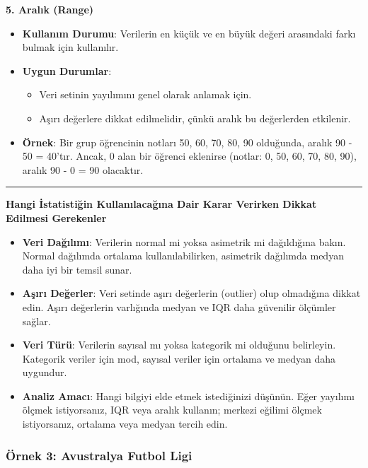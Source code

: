 \documentclass[
  letterpaper,
  DIV=11,
  numbers=noendperiod]{scrartcl}
\begin{document}
\begin{tcolorbox}
\textbf{5. Aralık (Range)}

\begin{itemize}
\item
  \textbf{Kullanım Durumu}: Verilerin en küçük ve en büyük değeri
  arasındaki farkı bulmak için kullanılır.
\item
  \textbf{Uygun Durumlar}:

  \begin{itemize}
  \item
    Veri setinin yayılımını genel olarak anlamak için.
  \item
    Aşırı değerlere dikkat edilmelidir, çünkü aralık bu değerlerden
    etkilenir.
  \end{itemize}
\item
  \textbf{Örnek}: Bir grup öğrencinin notları 50, 60, 70, 80, 90
  olduğunda, aralık 90 - 50 = 40'tır. Ancak, 0 alan bir öğrenci
  eklenirse (notlar: 0, 50, 60, 70, 80, 90), aralık 90 - 0 = 90
  olacaktır.
\end{itemize}

\begin{center}\rule{0.5\linewidth}{0.5pt}\end{center}

\textbf{Hangi İstatistiğin Kullanılacağına Dair Karar Verirken Dikkat
Edilmesi Gerekenler}

\begin{itemize}
\item
  \textbf{Veri Dağılımı}: Verilerin normal mi yoksa asimetrik mi
  dağıldığına bakın. Normal dağılımda ortalama kullanılabilirken,
  asimetrik dağılımda medyan daha iyi bir temsil sunar.
\item
  \textbf{Aşırı Değerler}: Veri setinde aşırı değerlerin (outlier) olup
  olmadığına dikkat edin. Aşırı değerlerin varlığında medyan ve IQR daha
  güvenilir ölçümler sağlar.
\item
  \textbf{Veri Türü}: Verilerin sayısal mı yoksa kategorik mi olduğunu
  belirleyin. Kategorik veriler için mod, sayısal veriler için ortalama
  ve medyan daha uygundur.
\item
  \textbf{Analiz Amacı}: Hangi bilgiyi elde etmek istediğinizi düşünün.
  Eğer yayılımı ölçmek istiyorsanız, IQR veya aralık kullanın; merkezi
  eğilimi ölçmek istiyorsanız, ortalama veya medyan tercih edin.
\end{itemize}

\end{tcolorbox}

\hypertarget{uxf6rnek-3-avustralya-futbol-ligi}{%
\subsubsection{Örnek 3: Avustralya Futbol
Ligi}\label{uxf6rnek-3-avustralya-futbol-ligi}}
\end{document}
